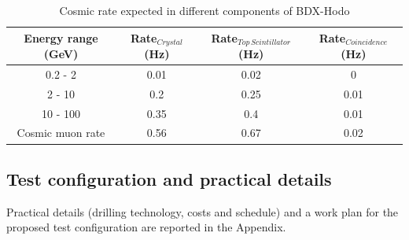 \begin{table}[htp]
\caption{Cosmic rate expected in different components of BDX-Hodo}
\begin{center}
\begin{tabular}{|c|c|c|c|}
\hline
Energy range  (GeV) & Rate$_{Crystal}$  (Hz)&  Rate$_{Top\,Scintillator} $(Hz) & Rate$_{Coincidence}$ (Hz) \\
\hline\hline
 0.2 - 2  & 0.01 &  0.02 & 0\\
 \hline
 2 - 10  & 0.2 &  0.25 & 0.01\\
 \hline
 10 - 100  & 0.35 &  0.4 & 0.01\\
\hline\hline
Cosmic muon rate  & 0.56 &  0.67 & 0.02 \\
\hline\hline
\end{tabular}
\end{center}
\label{tab:cosmic}
\end{table}%

\subsection{Test configuration and practical details}
Practical details (drilling technology, costs and schedule) and a work plan for the proposed test configuration  are reported in the Appendix.


